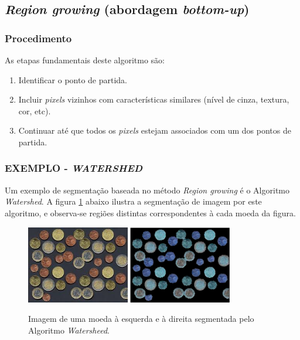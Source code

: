 \subsection{\textit{Region growing} (abordagem \textit{bottom-up})}
\subsubsection{Procedimento}
As etapas fundamentais deste algoritmo são: 
\begin{enumerate}
    \item Identificar o ponto de partida.
    \item Incluir \textit{pixels} vizinhos com características similares (nível de cinza, textura, cor, etc).
    \item Continuar até que todos os \textit{pixels} estejam associados com um dos pontos de partida.
\end{enumerate}

\subsubsection{EXEMPLO - \textit{WATERSHED}}
Um exemplo de segmentação baseada no método \textit{Region growing} é o Algoritmo \textit{Watershed}. A figura \ref{fig:coins} abaixo ilustra a segmentação de imagem por este algoritmo, e observa-se regiões distintas correspondentes à cada moeda da figura.

\begin{figure}[!htb]
 \centering
 \def\baselinestretch{1}\small\normalsize
 \includegraphics[width=0.4\textwidth]{img/stf-coins.jpg}\qquad
 \includegraphics[width=0.4\textwidth]{img/stf-coins-watersheed.jpg} 
 \caption{\label{fig:coins}Imagem de uma moeda \citep{stanford} à esquerda e à direita segmentada pelo Algoritmo \textit{Watersheed}.}
\end{figure}
 
 

